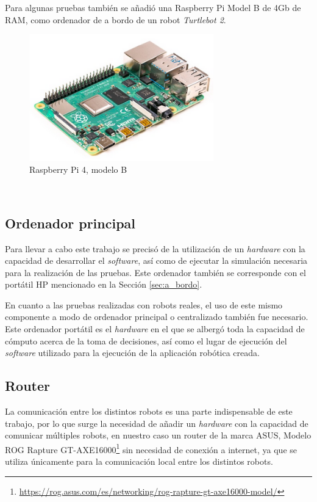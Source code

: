 Para algunas pruebas también se añadió una Raspberry Pi Model B de 4Gb de RAM,
como ordenador de a bordo de un robot \textit{Turtlebot 2}.

\begin{figure} [h!]
  \begin{center}
    \includegraphics[width=8cm]{figs/raspberry_pi_4b}
  \end{center}
  \caption{Raspberry Pi 4, modelo B \citep{raspberry_pi_4b}}
  \label{fig:raspberry_pi}
\end{figure}\


\subsection{Ordenador principal}
\label{sec:ordenador_principal}

Para llevar a cabo este trabajo se precisó de la utilización de un
\textit{hardware} con la capacidad de desarrollar el \textit{software}, así como
de ejecutar la simulación necesaria para la realización de las pruebas.
Este ordenador también se corresponde con el portátil HP mencionado en la
Sección \ref{sec:a_bordo}.

En cuanto a las pruebas realizadas con robots reales, el uso de este mismo
componente a modo de ordenador principal o centralizado también fue necesario.
Este ordenador portátil es el \textit{hardware} en el que se albergó toda la
capacidad de cómputo acerca de la toma de decisiones, así como el lugar de
ejecución del \textit{software} utilizado para la ejecución de la aplicación
robótica creada.

\subsection{Router}
\label{sec:router}

La comunicación entre los distintos robots es una parte indispensable de este
trabajo, por lo que surge la necesidad de añadir un \textit{hardware} con la
capacidad de comunicar múltiples robots, en nuestro caso un router de la marca
ASUS, Modelo ROG Rapture
GT-AXE16000\footnote{\url{https://rog.asus.com/es/networking/rog-rapture-gt-axe16000-model/}}
sin necesidad de conexión a internet, ya que se utiliza únicamente para la
comunicación local entre los distintos robots.

